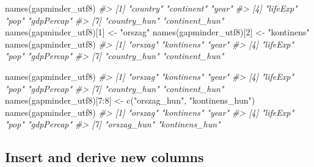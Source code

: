 \documentclass[
]{book}
\newenvironment{Shaded}{\begin{snugshade}}{\end{snugshade}}
\newcommand{\CommentTok}[1]{\textcolor[rgb]{0.56,0.35,0.01}{\textit{#1}}}
\newcommand{\DecValTok}[1]{\textcolor[rgb]{0.00,0.00,0.81}{#1}}
\newcommand{\FunctionTok}[1]{\textcolor[rgb]{0.00,0.00,0.00}{#1}}
\newcommand{\NormalTok}[1]{#1}
\newcommand{\OtherTok}[1]{\textcolor[rgb]{0.56,0.35,0.01}{#1}}
\newcommand{\SpecialCharTok}[1]{\textcolor[rgb]{0.00,0.00,0.00}{#1}}
\newcommand{\StringTok}[1]{\textcolor[rgb]{0.31,0.60,0.02}{#1}}
\begin{document}
\begin{Shaded}
\begin{Highlighting}[]
\FunctionTok{names}\NormalTok{(gapminder\_utf8)}
\CommentTok{\#\textgreater{} [1] "country"       "continent"     "year"         }
\CommentTok{\#\textgreater{} [4] "lifeExp"       "pop"           "gdpPercap"    }
\CommentTok{\#\textgreater{} [7] "country\_hun"   "continent\_hun"}
\FunctionTok{names}\NormalTok{(gapminder\_utf8)[}\DecValTok{1}\NormalTok{] }\OtherTok{\textless{}{-}} \StringTok{"orszag"}
\FunctionTok{names}\NormalTok{(gapminder\_utf8)[}\DecValTok{2}\NormalTok{] }\OtherTok{\textless{}{-}} \StringTok{"kontinens"}
\FunctionTok{names}\NormalTok{(gapminder\_utf8)}
\CommentTok{\#\textgreater{} [1] "orszag"        "kontinens"     "year"         }
\CommentTok{\#\textgreater{} [4] "lifeExp"       "pop"           "gdpPercap"    }
\CommentTok{\#\textgreater{} [7] "country\_hun"   "continent\_hun"}

\FunctionTok{names}\NormalTok{(gapminder\_utf8)}
\CommentTok{\#\textgreater{} [1] "orszag"        "kontinens"     "year"         }
\CommentTok{\#\textgreater{} [4] "lifeExp"       "pop"           "gdpPercap"    }
\CommentTok{\#\textgreater{} [7] "country\_hun"   "continent\_hun"}
\FunctionTok{names}\NormalTok{(gapminder\_utf8)[}\DecValTok{7}\SpecialCharTok{:}\DecValTok{8}\NormalTok{] }\OtherTok{\textless{}{-}} \FunctionTok{c}\NormalTok{(}\StringTok{"orszag\_hun"}\NormalTok{, }\StringTok{"kontinens\_hun"}\NormalTok{)}
\FunctionTok{names}\NormalTok{(gapminder\_utf8)}
\CommentTok{\#\textgreater{} [1] "orszag"        "kontinens"     "year"         }
\CommentTok{\#\textgreater{} [4] "lifeExp"       "pop"           "gdpPercap"    }
\CommentTok{\#\textgreater{} [7] "orszag\_hun"    "kontinens\_hun"}
\end{Highlighting}
\end{Shaded}

\hypertarget{br-changing}{%
\subsection{Insert and derive new columns}\label{br-changing}}
\end{document}
